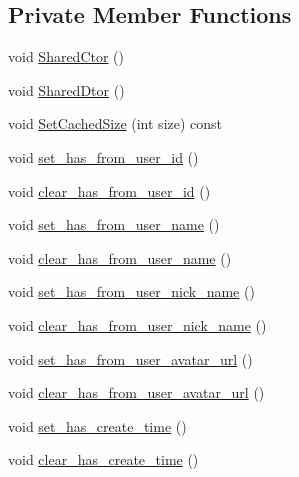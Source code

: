 \subsection*{Private Member Functions}
\begin{DoxyCompactItemize}
\item 
void \hyperlink{class_i_m_1_1_base_define_1_1_server_msg_info_a7ceb56beffd7ed49784931097f144de2}{Shared\+Ctor} ()
\item 
void \hyperlink{class_i_m_1_1_base_define_1_1_server_msg_info_a2396a131005de2abfaf3951814416171}{Shared\+Dtor} ()
\item 
void \hyperlink{class_i_m_1_1_base_define_1_1_server_msg_info_a091fa9ddad6b602cac83d0fa354bd438}{Set\+Cached\+Size} (int size) const 
\item 
void \hyperlink{class_i_m_1_1_base_define_1_1_server_msg_info_aabc0b5dbde5550663de87e68c0961a4c}{set\+\_\+has\+\_\+from\+\_\+user\+\_\+id} ()
\item 
void \hyperlink{class_i_m_1_1_base_define_1_1_server_msg_info_a5e780d7f657cb1b25586b5f4f4444fd0}{clear\+\_\+has\+\_\+from\+\_\+user\+\_\+id} ()
\item 
void \hyperlink{class_i_m_1_1_base_define_1_1_server_msg_info_ae7e1ae02560f27fc51bd89382f5076b0}{set\+\_\+has\+\_\+from\+\_\+user\+\_\+name} ()
\item 
void \hyperlink{class_i_m_1_1_base_define_1_1_server_msg_info_a393687845975fc4aa966c32988f8f8c0}{clear\+\_\+has\+\_\+from\+\_\+user\+\_\+name} ()
\item 
void \hyperlink{class_i_m_1_1_base_define_1_1_server_msg_info_ad5de53f914d24bb3b31e264d2ce544c7}{set\+\_\+has\+\_\+from\+\_\+user\+\_\+nick\+\_\+name} ()
\item 
void \hyperlink{class_i_m_1_1_base_define_1_1_server_msg_info_aad5c1b1f87405b4c8536faec4d04f750}{clear\+\_\+has\+\_\+from\+\_\+user\+\_\+nick\+\_\+name} ()
\item 
void \hyperlink{class_i_m_1_1_base_define_1_1_server_msg_info_aa687f30d5d11fe636187ac2708cd8a1f}{set\+\_\+has\+\_\+from\+\_\+user\+\_\+avatar\+\_\+url} ()
\item 
void \hyperlink{class_i_m_1_1_base_define_1_1_server_msg_info_ae0c5ac169f84f1382a63ad851f4196a0}{clear\+\_\+has\+\_\+from\+\_\+user\+\_\+avatar\+\_\+url} ()
\item 
void \hyperlink{class_i_m_1_1_base_define_1_1_server_msg_info_ae286b299d5e2d2b44d0bab8e1a48ffc0}{set\+\_\+has\+\_\+create\+\_\+time} ()
\item 
void \hyperlink{class_i_m_1_1_base_define_1_1_server_msg_info_a7affde3cedbf3bee23e6fe554753100e}{clear\+\_\+has\+\_\+create\+\_\+time} ()

\end{DoxyCompactItemize}
